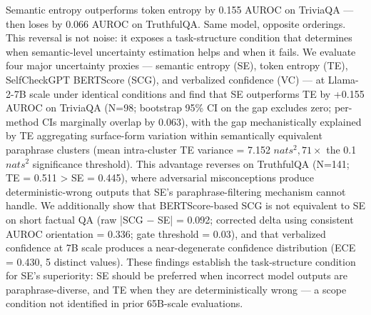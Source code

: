
Semantic entropy outperforms token entropy by 0.155 AUROC on TriviaQA --- then loses by 0.066 AUROC on TruthfulQA. Same model, opposite orderings. This reversal is not noise: it exposes a task-structure condition that determines when semantic-level uncertainty estimation helps and when it fails. We evaluate four major uncertainty proxies --- semantic entropy (SE), token entropy (TE), SelfCheckGPT BERTScore (SCG), and verbalized confidence (VC) --- at Llama-2-7B scale under identical conditions and find that SE outperforms TE by +0.155 AUROC on TriviaQA (N=98; bootstrap 95\% CI on the gap excludes zero; per-method CIs marginally overlap by 0.063), with the gap mechanistically explained by TE aggregating surface-form variation within semantically equivalent paraphrase clusters (mean intra-cluster TE variance = 7.152 $nats^2, 71\times$ the 0.1 $nats^2$ significance threshold). This advantage reverses on TruthfulQA (N=141; TE = 0.511 > SE = 0.445), where adversarial misconceptions produce deterministic-wrong outputs that SE's paraphrase-filtering mechanism cannot handle. We additionally show that BERTScore-based SCG is not equivalent to SE on short factual QA (raw |SCG $-$ SE| = 0.092; corrected delta using consistent AUROC orientation = 0.336; gate threshold = 0.03), and that verbalized confidence at 7B scale produces a near-degenerate confidence distribution (ECE = 0.430, 5 distinct values). These findings establish the task-structure condition for SE's superiority: SE should be preferred when incorrect model outputs are paraphrase-diverse, and TE when they are deterministically wrong --- a scope condition not identified in prior 65B-scale evaluations.

